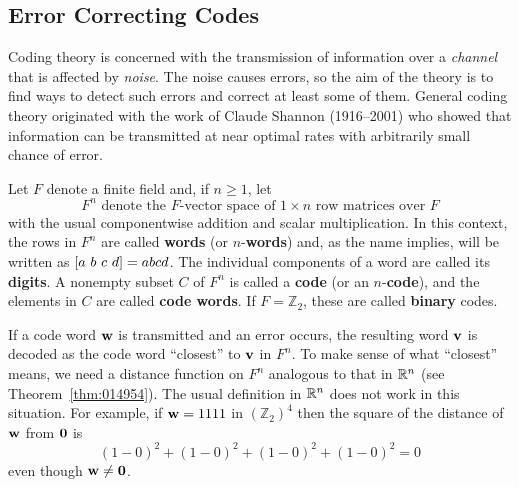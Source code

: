 \subsection*{Error Correcting Codes}

Coding theory is concerned with the transmission of information over a \textit{channel} that is affected by \textit{noise}. The noise causes errors, so the aim of the theory is to find ways to detect such errors and correct at least some of them. General coding theory originated with the work of Claude Shannon (1916--2001) who showed that information can be transmitted at near optimal rates with arbitrarily small chance of error.

Let $F$ denote a finite field and, if $n \geq 1$, let
\begin{equation*}
F^{n} \mbox{ denote the }F\mbox{-vector space of } 1 \times n \mbox{ row matrices over } F 
\end{equation*}
with the usual componentwise addition and scalar multiplication. In this context, the rows in $F^{n}$ are called \textbf{words} (or $n$-\textbf{words}) and, as the name implies, will be written as $\left[ a\ b\ c\ d \right] = abcd$. The individual components of a word are called its \textbf{digits}. A nonempty subset $C$ of $F^{n}$ is called a \textbf{code} (or an $n$-\textbf{code}), and the elements in $C$ are called \textbf{code words}. If $F = \mathbb{Z}_2$, these are called \textbf{binary} codes.

If a code word $\textbf{w}$ is transmitted and an error occurs, the resulting word $\textbf{v}$ is decoded as the code word ``closest'' to $\textbf{v}$ in $F^{n}$. To make sense of what ``closest'' means, we need a distance function on $F^{n}$ analogous to that in $\mathbb{R}^n$ (see Theorem~\ref{thm:014954}). The usual definition in $\mathbb{R}^n$ does not work in this situation. For example, if $\textbf{w} = 1111$ in $(\mathbb{Z}_2)^4$ then the square of the distance of $\textbf{w}$ from $\textbf{0}$ is 
\begin{equation*}
(1 - 0)^{2} + (1 - 0)^{2} + (1 - 0)^{2} + (1 - 0)^{2} = 0
\end{equation*}
even though $\textbf{w} \neq \textbf{0}$.

